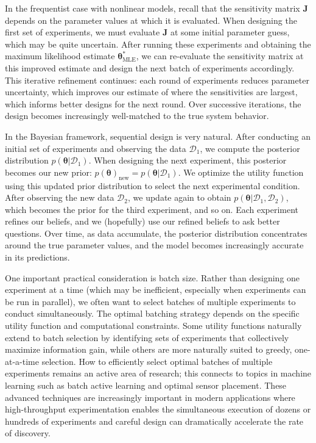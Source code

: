 In the frequentist case with nonlinear models, recall that the sensitivity matrix $\mathbf{J}$ depends on the parameter values at which it is evaluated. When designing the first set of experiments, we must evaluate $\mathbf{J}$ at some initial parameter guess, which may be quite uncertain. After running these experiments and obtaining the maximum likelihood estimate $\boldsymbol{\theta}^*_{\text{MLE}}$, we can re-evaluate the sensitivity matrix at this improved estimate and design the next batch of experiments accordingly. This iterative refinement continues: each round of experiments reduces parameter uncertainty, which improves our estimate of where the sensitivities are largest, which informs better designs for the next round. Over successive iterations, the design becomes increasingly well-matched to the true system behavior.

In the Bayesian framework, sequential design is very natural. After conducting an initial set of experiments and observing the data $\mathcal{D}_1$, we compute the posterior distribution $p(\boldsymbol{\theta}|\mathcal{D}_1)$. When designing the next experiment, this posterior becomes our new prior: $p(\boldsymbol{\theta})_{\text{new}} = p(\boldsymbol{\theta}|\mathcal{D}_1)$. We optimize the utility function using this updated prior distribution to select the next experimental condition. After observing the new data $\mathcal{D}_2$, we update again to obtain $p(\boldsymbol{\theta}|\mathcal{D}_1, \mathcal{D}_2)$, which becomes the prior for the third experiment, and so on. Each experiment refines our beliefs, and we (hopefully) use our refined beliefs to ask better questions. Over time, as data accumulate, the posterior distribution concentrates around the true parameter values, and the model becomes increasingly accurate in its predictions.

One important practical consideration is batch size. Rather than designing one experiment at a time (which may be inefficient, especially when experiments can be run in parallel), we often want to select batches of multiple experiments to conduct simultaneously. The optimal batching strategy depends on the specific utility function and computational constraints. Some utility functions naturally extend to batch selection by identifying sets of experiments that collectively maximize information gain, while others are more naturally suited to greedy, one-at-a-time selection. How to efficiently select optimal batches of multiple experiments remains an active area of research; this connects to topics in machine learning such as batch active learning and optimal sensor placement. These advanced techniques are increasingly important in modern applications where high-throughput experimentation enables the simultaneous execution of dozens or hundreds of experiments and careful design can dramatically accelerate the rate of discovery.

